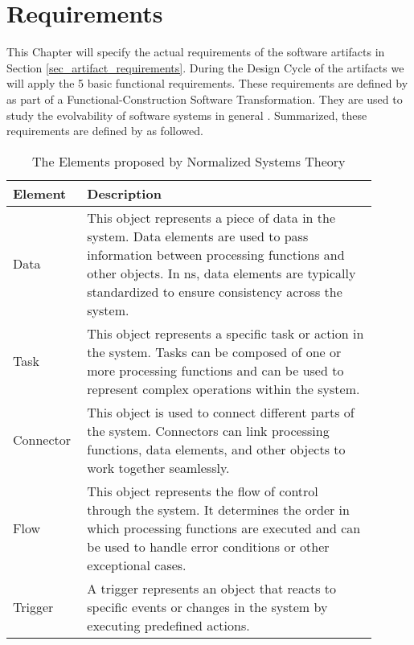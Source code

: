 \chapter{Requirements} \label{chap_requirements} 

This Chapter will specify the actual requirements of the software artifacts in Section
\ref{sec_artifact_requirements}. During the Design Cycle of the artifacts we will apply
the 5 basic functional requirements. These requirements are defined by
\textcite[254-261]{mannaert_normalized_2016} as part of a Functional-Construction Software
Transformation. They are used to study the evolvability  of software systems in general
\parencite[251]{mannaert_normalized_2016}. Summarized, these requirements are defined by
\textcite{mannaert_normalized_2016} as followed.



\begin{table}[H]
    \begin{tabular}{ p{0.15\linewidth} p{0.75\linewidth}}
        \hline
        \textbf{Element} & \textbf{Description} \\ 
        \hline
        Data & This object represents a piece of data in the system. Data elements are
        used to pass information between processing functions and other objects. In
        \gls{ns}, data elements are typically standardized to ensure consistency across
        the system.\\ \midrule

        Task & This object represents a specific task or action in the system. Tasks can
        be composed of one or more processing functions and can be used to represent
        complex operations within the system.\\ \midrule

        Connector & This object is used to connect different parts of the system.
        Connectors can link processing functions, data elements, and other objects to work
        together seamlessly.\\ \midrule

        Flow & This object represents the flow of control through the system.
        It determines the order in which processing functions are executed and can be used
        to handle error conditions or other exceptional cases.\\ \midrule

        Trigger & A trigger represents an object that reacts to specific events or changes in the system
        by executing predefined actions.\\

        \bottomrule
    \end{tabular}
    \caption{The Elements proposed by Normalized Systems Theory}
    \label{ns_element}
\end{table}


